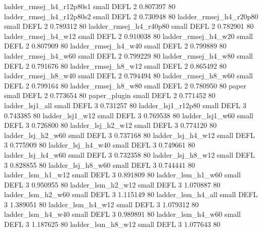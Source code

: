 ladder_rmsej_h4_r12p80s1      small     DEFL                 2 0.807397 80
ladder_rmsej_h4_r12p80s2      small     DEFL                 2 0.730948 80
  ladder_rmsej_h4_r20p80      small     DEFL                 2 0.789312 80
  ladder_rmsej_h4_r40p80      small     DEFL                 2 0.782901 80
     ladder_rmsej_h4_w12      small     DEFL                 2 0.910038 80
     ladder_rmsej_h4_w20      small     DEFL                 2 0.807909 80
     ladder_rmsej_h4_w40      small     DEFL                 2 0.799889 80
     ladder_rmsej_h4_w60      small     DEFL                 2 0.799229 80
     ladder_rmsej_h4_w80      small     DEFL                 2 0.791676 80
     ladder_rmsej_h8_w12      small     DEFL                 2 0.865492 80
     ladder_rmsej_h8_w40      small     DEFL                 2 0.794494 80
     ladder_rmsej_h8_w60      small     DEFL                 2 0.799164 80
     ladder_rmsej_h8_w80      small     DEFL                 2 0.780950 80
                   paper      small     DEFL                 2 0.773654 80
            paper_plugin      small     DEFL                 2 0.771452 80
         ladder_lsj1_all      small     DEFL                 3 0.731257 80
      ladder_lsj1_r12p80      small     DEFL                 3 0.743385 80
         ladder_lsj1_w12      small     DEFL                 3 0.769538 80
         ladder_lsj1_w60      small     DEFL                 3 0.726800 80
       ladder_lsj_h2_w12      small     DEFL                 3 0.774120 80
       ladder_lsj_h2_w60      small     DEFL                 3 0.737168 80
       ladder_lsj_h4_w12      small     DEFL                 3 0.775909 80
       ladder_lsj_h4_w40      small     DEFL                 3 0.749661 80
       ladder_lsj_h4_w60      small     DEFL                 3 0.732358 80
       ladder_lsj_h8_w12      small     DEFL                 3 0.828855 80
       ladder_lsj_h8_w60      small     DEFL                 3 0.744441 80
       ladder_lsm_h1_w12      small     DEFL                 3 0.891809 80
       ladder_lsm_h1_w60      small     DEFL                 3 0.950955 80
       ladder_lsm_h2_w12      small     DEFL                 3 1.070887 80
       ladder_lsm_h2_w60      small     DEFL                 3 1.115149 80
       ladder_lsm_h4_all      small     DEFL                 3 1.389051 80
       ladder_lsm_h4_w12      small     DEFL                 3 1.079312 80
       ladder_lsm_h4_w40      small     DEFL                 3 0.989891 80
       ladder_lsm_h4_w60      small     DEFL                 3 1.187625 80
       ladder_lsm_h8_w12      small     DEFL                 3 1.077643 80
